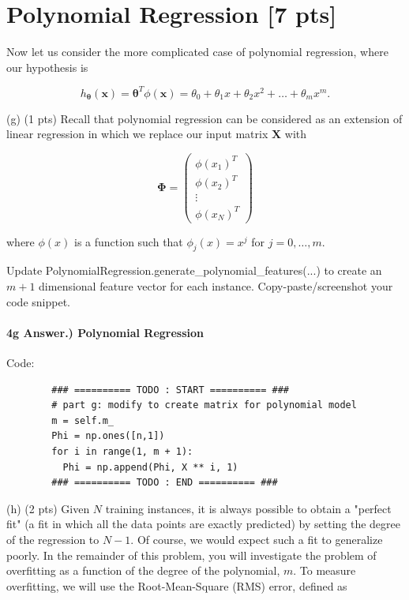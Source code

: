 \documentclass[10pt]{article}
\begin{document}
\section*{Polynomial Regression [7 pts]}
Now let us consider the more complicated case of polynomial regression, where our hypothesis is

$$
h_{\boldsymbol{\theta}}(\boldsymbol{x})=\boldsymbol{\theta}^{T} \phi(\boldsymbol{x})=\theta_{0}+\theta_{1} x+\theta_{2} x^{2}+\ldots+\theta_{m} x^{m} .
$$

(g) (1 pts) Recall that polynomial regression can be considered as an extension of linear regression in which we replace our input matrix $\boldsymbol{X}$ with

$$
\boldsymbol{\Phi}=\left(\begin{array}{c}
\phi\left(x_{1}\right)^{T} \\
\phi\left(x_{2}\right)^{T} \\
\vdots \\
\phi\left(x_{N}\right)^{T}
\end{array}\right)
$$

where $\phi(x)$ is a function such that $\phi_{j}(x)=x^{j}$ for $j=0, \ldots, m$.

Update PolynomialRegression.generate\_polynomial\_features(...) to create an $m+1$ dimensional feature vector for each instance. Copy-paste/screenshot your code snippet.

\paragraph{4g Answer.) Polynomial Regression}
\hspace{1cm}

Code:\\
\begin{verbatim}
        ### ========== TODO : START ========== ###
        # part g: modify to create matrix for polynomial model
        m = self.m_
        Phi = np.ones([n,1])
        for i in range(1, m + 1):
          Phi = np.append(Phi, X ** i, 1)
        ### ========== TODO : END ========== ###
\end{verbatim}

(h) (2 pts) Given $N$ training instances, it is always possible to obtain a "perfect fit" (a fit in which all the data points are exactly predicted) by setting the degree of the regression to $N-1$. Of course, we would expect such a fit to generalize poorly. In the remainder of this problem, you will investigate the problem of overfitting as a function of the degree of the polynomial, $m$. To measure overfitting, we will use the Root-Mean-Square (RMS) error, defined as
\end{document}
